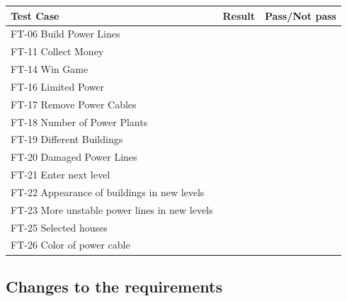 	\begin{tabular}{| p{2cm} | p{7cm} | p{3cm} |}
		\hline
		\rowcolor{lightgray}
		{\bf Test Case} & {\bf Result} & {\bf Pass/Not pass} \\ \hline

	  	FT-06 Build Power Lines &  &  \\ \hline

	  	FT-11 Collect Money &  &  \\ \hline

	  	FT-14 Win Game &  &  \\ \hline
	  	
	  	FT-16 Limited Power &  &  \\ \hline
	  	
	  	FT-17 Remove Power Cables &  &  \\ \hline
	  	
	  	FT-18 Number of Power Plants &  &  \\ \hline
	  	
	  	FT-19 Different Buildings &  &  \\ \hline

	  	FT-20 Damaged Power Lines &  &  \\ \hline
	  	
	  	FT-21 Enter next level &  &  \\ \hline

	  	FT-22 Appearance of buildings in new levels &  &  \\ \hline

	  	FT-23 More unstable power lines in new levels &  &  \\ \hline

	  	FT-25 Selected houses &  &  \\ \hline

	  	FT-26 Color of power cable &  &  \\ \hline

	\end{tabular}

\subsection{Changes to the requirements}
	
